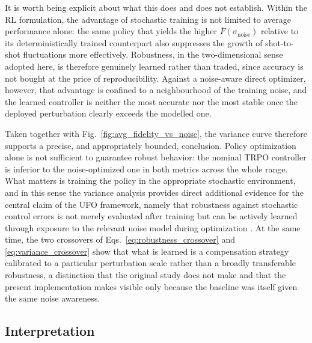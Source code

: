 It is worth being explicit about what this does and does not establish. Within the RL formulation, the advantage of stochastic training is not limited to average performance alone: the same policy that yields the higher \(\overline{F}(\sigma_{\mathrm{noise}})\) relative to its deterministically trained counterpart also suppresses the growth of shot-to-shot fluctuations more effectively. Robustness, in the two-dimensional sense adopted here, is therefore genuinely learned rather than traded, since accuracy is not bought at the price of reproducibility. Against a noise-aware direct optimizer, however, that advantage is confined to a neighbourhood of the training noise, and the learned controller is neither the most accurate nor the most stable once the deployed perturbation clearly exceeds the modelled one.

Taken together with Fig.~\ref{fig:avg_fidelity_vs_noise}, the variance curve therefore supports a precise, and appropriately bounded, conclusion. Policy optimization alone is not sufficient to guarantee robust behavior: the nominal TRPO controller is inferior to the noise-optimized one in both metrics across the whole range. What matters is training the policy in the appropriate stochastic environment, and in this sense the variance analysis provides direct additional evidence for the central claim of the UFO framework, namely that robustness against stochastic control errors is not merely evaluated after training but can be actively learned through exposure to the relevant noise model during optimization \cite{Niu2019}. At the same time, the two crossovers of Eqs.~\eqref{eq:robustness_crossover} and \eqref{eq:variance_crossover} show that what is learned is a compensation strategy calibrated to a particular perturbation scale rather than a broadly transferable robustness, a distinction that the original study does not make and that the present implementation makes visible only because the baseline was itself given the same noise awareness.


\subsection{Interpretation}
\label{subsec:robustness_interpretation}


